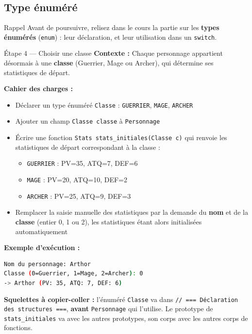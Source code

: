 \subsection{Type énuméré}

\begin{UPSTIinfor}{Rappel}
  Avant de poursuivre, relisez dans le cours la partie sur les \textbf{types énumérés}
  (\texttt{enum}) : leur déclaration, et leur utilisation dans un \texttt{switch}.
\end{UPSTIinfor}

\begin{UPSTIManipulation}{Étape 4 — Choisir une classe}
  \textbf{Contexte :} Chaque personnage appartient désormais à une \textbf{classe}
  (Guerrier, Mage ou Archer), qui détermine ses statistiques de départ.

  \textbf{Cahier des charges :}
  \begin{itemize}
    \item Déclarer un type énuméré \texttt{Classe} : \texttt{GUERRIER}, \texttt{MAGE},
      \texttt{ARCHER}
    \item Ajouter un champ \texttt{Classe classe} à \texttt{Personnage}
    \item Écrire une fonction \texttt{Stats stats\_initiales(Classe c)} qui renvoie les
      statistiques de départ correspondant à la classe :
      \begin{itemize}
        \item \texttt{GUERRIER} : PV=35, ATQ=7, DEF=6
        \item \texttt{MAGE} : PV=20, ATQ=10, DEF=2
        \item \texttt{ARCHER} : PV=25, ATQ=9, DEF=3
      \end{itemize}
    \item Remplacer la saisie manuelle des statistiques par la demande du \textbf{nom} et de la
      \textbf{classe} (entier 0, 1 ou 2), les statistiques étant alors initialisées
      automatiquement
  \end{itemize}

  \textbf{Exemple d'exécution :}
  \begin{lstlisting}[language=bash]
Nom du personnage: Arthor
Classe (0=Guerrier, 1=Mage, 2=Archer): 0
-> Arthor (PV: 35, ATQ: 7, DEF: 6)
  \end{lstlisting}

  \textbf{Squelettes à copier-coller :} l'énuméré \texttt{Classe} va dans
  \texttt{// === Déclaration des structures ===}, \textbf{avant} \texttt{Personnage} qui
  l'utilise. Le prototype de \texttt{stats\_initiales} va avec les autres prototypes, son corps
  avec les autres corps de fonctions.


\end{UPSTIManipulation}
